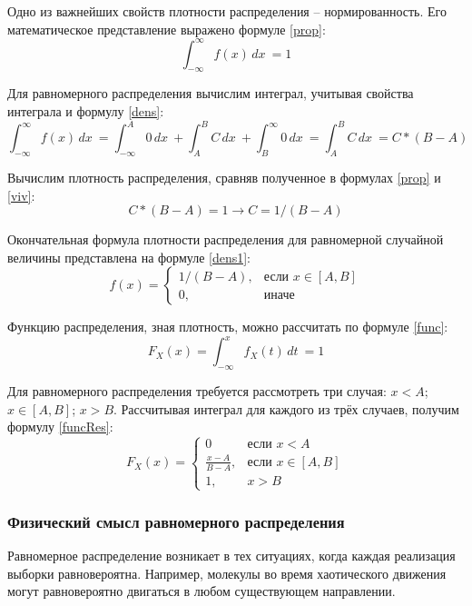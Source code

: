 Одно из важнейших свойств плотности распределения -- нормированность. Его математическое представление выражено формуле \ref{prop}:
\begin{equation}
	\label{prop}
	\int_{-\infty}^{\infty} f(x) \,dx \ = 1
\end{equation}

Для равномерного распределения вычислим интеграл, учитывая свойства интеграла и формулу \ref{dens}:
\begin{equation}
	\label{viv}
	\int_{-\infty}^{\infty} f(x) \,dx \ = \int_{-\infty}^{A} 0 \,dx \ + \int_{A}^{B} C \,dx \ + \int_{B}^{\infty} 0 \,dx \ = \int_{A}^{B} C \,dx \ = C*(B - A)
\end{equation}

Вычислим плотность распределения, сравняв полученное в формулах \ref{prop} и \ref{viv}:
\begin{equation}
	\label{vivProb}
	C*(B - A) = 1 \rightarrow C = 1 / (B - A)
\end{equation}

Окончательная формула плотности распределения для равномерной случайной величины представлена на формуле \ref{dens1}:
\begin{equation}
	\label{dens1}
	f(x)= 
	\begin{cases}
		1 / (B - A),& \text{если } x \in [A, B]\\
		0,              & \text{иначе}
	\end{cases}
\end{equation}

Функцию распределения, зная плотность, можно рассчитать по формуле \ref{func}:
\begin{equation}
	\label{func}
	F_X(x) = \int_{-\infty}^{x} f_X(t) \,dt \ = 1
\end{equation}

\newpage
Для равномерного распределения требуется рассмотреть три случая: $x < A$; $x \in [A, B]$; $x > B$. Рассчитывая интеграл для каждого из трёх случаев, получим формулу \ref{funcRes}:
\begin{equation}
	\label{funcRes}
	F_X(x)= 
	\begin{cases}
		0 & \text{если } x < A\\
		\frac{x - A}{B - A},& \text{если } x \in [A, B]\\
		1,              & x > B
	\end{cases}
\end{equation}

\subsubsection*{Физический смысл равномерного распределения}
Равномерное распределение возникает в тех ситуациях, когда каждая реализация выборки равновероятна.
Например, молекулы во время хаотического движения могут равновероятно двигаться в любом существующем направлении.

